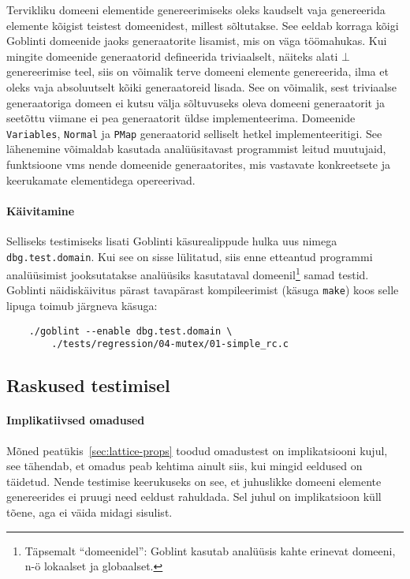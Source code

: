 \documentclass[../thesis.tex]{subfiles}
\begin{document}
Tervikliku domeeni elementide genereerimiseks oleks kaudselt vaja genereerida elemente kõigist teistest domeenidest, millest sõltutakse. See eeldab korraga kõigi Goblinti domeenide jaoks generaatorite lisamist, mis on väga töömahukas. Kui mingite domeenide generaatorid defineerida triviaalselt, näiteks alati $\bot$ genereerimise teel, siis on võimalik terve domeeni elemente genereerida, ilma et oleks vaja absoluutselt kõiki generaatoreid lisada. See on võimalik, sest triviaalse generaatoriga domeen ei kutsu välja sõltuvuseks oleva domeeni generaatorit ja seetõttu viimane ei pea generaatorit üldse implementeerima. Domeenide \texttt{Variables}, \texttt{Normal} ja \texttt{PMap} generaatorid selliselt hetkel implementeeritigi.
See lähenemine võimaldab kasutada analüüsitavast programmist leitud muutujaid, funktsioone vms nende domeenide generaatorites, mis vastavate konkreetsete ja keerukamate elementidega opereerivad.

\paragraph{Käivitamine}
Selliseks testimiseks lisati Goblinti käsurealippude hulka uus nimega \texttt{dbg.test.domain}. Kui see on sisse lülitatud, siis enne etteantud programmi analüüsimist jooksutatakse analüüsiks kasutataval domeenil\footnote{Täpsemalt \enquote{domeenidel}: Goblint kasutab analüüsis kahte erinevat domeeni, n-ö lokaalset ja globaalset.} samad testid. Goblinti näidiskäivitus pärast tavapärast kompileerimist (käsuga \texttt{make}) koos selle lipuga toimub järgneva käsuga:
\begin{verbatim}
	./goblint --enable dbg.test.domain \
	    ./tests/regression/04-mutex/01-simple_rc.c
\end{verbatim}

\subsection{Raskused testimisel}
\paragraph{Implikatiivsed omadused}
Mõned peatükis~\ref{sec:lattice-props} toodud omadustest on implikatsiooni kujul, see tähendab, et omadus peab kehtima ainult siis, kui mingid eeldused on täidetud. Nende testimise keerukuseks on see, et juhuslikke domeeni elemente genereerides ei pruugi need eeldust rahuldada. Sel juhul on implikatsioon küll tõene, aga ei väida midagi sisulist.
\end{document}
